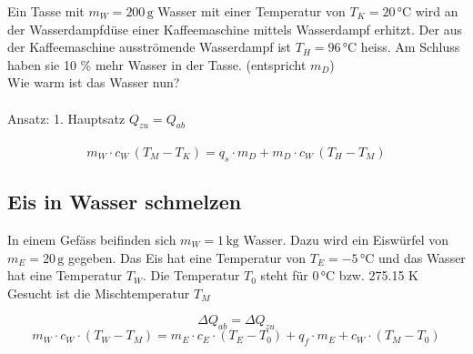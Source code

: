 Ein Tasse mit $m_W = 200 \, \mathrm{g}$ Wasser  mit einer Temperatur von $T_K = 20 \, \text{°C}$ wird an
der Wasserdampfdüse einer Kaffeemaschine mittels Wasserdampf erhitzt. Der aus der
Kaffeemaschine ausströmende Wasserdampf ist $T_H = 96 \, \text{°C}$ heiss. Am Schluss haben sie 10 \%
mehr Wasser in der Tasse. (entspricht $m_D$)\\
Wie warm ist das Wasser nun? \\
\\
Ansatz: 1. Hauptsatz \quad $Q_{zu} = Q_{ab}$ \\
\\
$$ m_W \cdot c_W \, (T_M - T_K) = q_s \cdot m_D + m_D \cdot c_W \, (T_H - T_M) $$



\subsection{Eis in Wasser schmelzen}

In einem Gefäss beifinden sich $m_W = 1 \, \mathrm{kg}$ Wasser. Dazu wird ein Eiswürfel von $m_E = 20 \, \mathrm{g}$ gegeben. Das Eis hat eine Temperatur von $T_E = -5 \, \text{°C}$ und das Wasser hat eine Temperatur $T_W$. Die Temperatur $T_0$ steht für $0 \, \text{°C}$ bzw. 275.15 K \\
Gesucht ist die Mischtemperatur $T_M$ 

$$ \Delta Q_{ab} = \Delta Q_{zu}$$
$$ m_W \cdot c_W \cdot (T_W - T_M) = m_E \cdot c_E \cdot (T_E - T_0) + q_f \cdot m_E + c_W \cdot (T_M - T_0) $$
